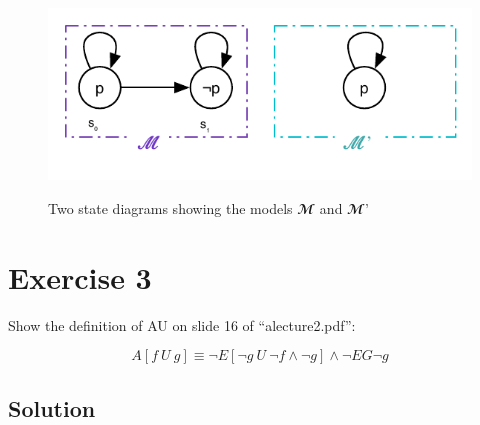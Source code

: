 \documentclass[a4paper, 12pt]{article}
\begin{document}
\begin{figure}[htbp]
    \caption{Two state diagrams showing the models $𝓜$ and $𝓜’$}
    \vskip 0.2cm
    \centering
    \includegraphics[width=1\textwidth]{Figures/State Diagram AGEFp}
    \label{figure:State_Diagram_AGEFp}
\end{figure}

\section{Exercise 3}

Show the definition of AU on slide 16 of “alecture2.pdf”:

\[
    A[f ~U~ g] ≡ ¬E[¬g~U~¬f ∧ ¬g] ∧ ¬EG¬g
\]

\subsection{Solution}





\end{document}
